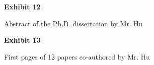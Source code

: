 \documentclass{article}
\begin{document}
% 

% 

% 


\vspace*{\fill}
\begin{center}

{\LARGE \bf
Exhibit 12
}

\vspace{10\baselineskip}

{\large Abstract of the Ph.D. dissertation by Mr. Hu}

\end{center}
\vspace*{\fill}


% 



\vspace*{\fill}
\begin{center}

{\LARGE \bf
Exhibit 13
}

\vspace{10\baselineskip}

{\large  First pages of 12 papers co-authored by Mr. Hu}

\end{center}
\vspace*{\fill}


% 

% 

% 

% 

% 

% 

% 
\end{document}
